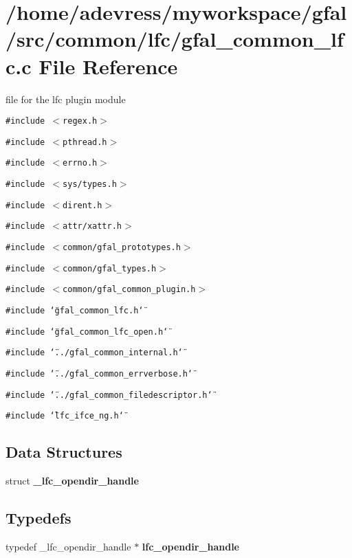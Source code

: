 \section{/home/adevress/myworkspace/gfal/src/common/lfc/gfal\_\-common\_\-lfc.c File Reference}
\label{gfal__common__lfc_8c}
file for the lfc plugin module 

{\tt \#include $<$regex.h$>$}\par
{\tt \#include $<$pthread.h$>$}\par
{\tt \#include $<$errno.h$>$}\par
{\tt \#include $<$sys/types.h$>$}\par
{\tt \#include $<$dirent.h$>$}\par
{\tt \#include $<$attr/xattr.h$>$}\par
{\tt \#include $<$common/gfal\_\-prototypes.h$>$}\par
{\tt \#include $<$common/gfal\_\-types.h$>$}\par
{\tt \#include $<$common/gfal\_\-common\_\-plugin.h$>$}\par
{\tt \#include \char`\"{}gfal\_\-common\_\-lfc.h\char`\"{}}\par
{\tt \#include \char`\"{}gfal\_\-common\_\-lfc\_\-open.h\char`\"{}}\par
{\tt \#include \char`\"{}../gfal\_\-common\_\-internal.h\char`\"{}}\par
{\tt \#include \char`\"{}../gfal\_\-common\_\-errverbose.h\char`\"{}}\par
{\tt \#include \char`\"{}../gfal\_\-common\_\-filedescriptor.h\char`\"{}}\par
{\tt \#include \char`\"{}lfc\_\-ifce\_\-ng.h\char`\"{}}\par
\subsection*{Data Structures}
\begin{CompactItemize}
\item 
struct \textbf{\_\-lfc\_\-opendir\_\-handle}
\end{CompactItemize}
\subsection*{Typedefs}
\begin{CompactItemize}
\item 
typedef \_\-lfc\_\-opendir\_\-handle $\ast$ \textbf{lfc\_\-opendir\_\-handle}\label{gfal__common__lfc_8c_5cac68b08f5b09ea46c43428e0fc2cc2}

\end{CompactItemize}
